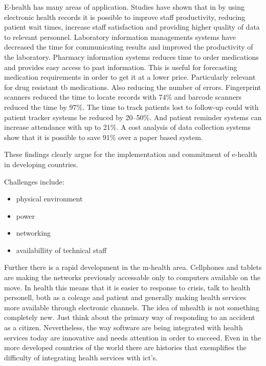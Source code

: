 E-health has many areas of application. Studies have shown that in by using electronic health records it is possible to improve staff productivity, reducing patient wait times, increase staff satisfaction and providing higher quality of data to relevant personnel. Laboratory information managements systems have decreased the time for communicating results and improved the productivity of the laboratory. Pharmacy information systems reduces time to order medications and provides easy access to past information. This is useful for forecasting medication requirements in order to get it at a lower price. Particularly relevant for drug resistant \gls{tb} medications. Also reducing the number of errors. Fingerprint scanners reduced the time to locate records with 74\% and barcode scanners reduced the time by 97\%. The time to track patients lost to follow-up could with patient tracker systems be reduced by 20--50\%. And patient reminder systems can increase attendance with up to 21\%. A cost analysis of data collection systems show that it is possible to save 91\% over a paper based system. 

These findings clearly argue for the implementation and commitment of e-health in developing countries. 

Challenges include:
\begin{itemize}
\item physical environment
\item power
\item networking
\item availabillity of technical staff
\end{itemize}

Further there is a rapid development in the m-health area.
Cellphones and tablets are making the networks previously accessable only to computers available on the move.
In health this means that it is easier to response to crisis, talk to health personell, both as a coleage and patient and generally making health services more available through electronic channels. 
The idea of mhealth is not something completely new. Just think about the primary way of responding to an accident as a citizen. 
Nevertheless, the way software are being integrated with health services today are innovative and needs attention in order to succeed.
Even in the more developed countries of the world there are histories that exemplifies the difficulty of integrating health services with \gls{ict}'s.  

\cite{ehealth:blaya}

